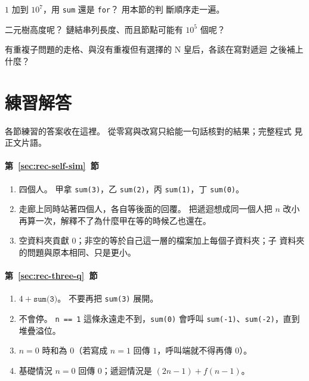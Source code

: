 
\begin{drills}[label=drills:rec-when]
\item $1$ 加到 $10^7$，用 \texttt{sum} 還是 \texttt{for}？ 用本節的判
斷順序走一遍。
\item 二元樹高度呢？ 鏈結串列長度、而且節點可能有 $10^5$ 個呢？
\item 有重複子問題的走格、與沒有重複但有選擇的 N 皇后，各該在寫對遞迴
之後補上什麼？
\end{drills}

{}
\section*{練習解答}

各節練習的答案收在這裡。 從零寫與改寫只給能一句話核對的結果；完整程式
見正文片語。

\paragraph{第~\ref{sec:rec-self-sim}~節}
\begin{enumerate}
\item 四個人。 甲拿 \texttt{sum(3)}，乙 \texttt{sum(2)}，丙
\texttt{sum(1)}，丁 \texttt{sum(0)}。
\item 走廊上同時站著四個人，各自等後面的回覆。 把遞迴想成同一個人把
$n$ 改小再算一次，解釋不了為什麼甲在等的時候乙也還在。
\item 空資料夾貢獻 $0$；非空的等於自己這一層的檔案加上每個子資料夾；子
資料夾的問題與原本相同、只是更小。
\end{enumerate}

\paragraph{第~\ref{sec:rec-three-q}~節}
\begin{enumerate}
\item $4 + \texttt{sum(3)}$。 不要再把 \texttt{sum(3)} 展開。
\item 不會停。 \texttt{n == 1} 這條永遠走不到，\texttt{sum(0)} 會呼叫
\texttt{sum(-1)}、\texttt{sum(-2)}，直到堆疊溢位。
\item $n = 0$ 時和為 $0$（若寫成 $n = 1$ 回傳 $1$，呼叫端就不得再傳
$0$）。
\item 基礎情況 $n = 0$ 回傳 $0$；遞迴情況是 $(2n-1) + f(n-1)$。
\end{enumerate}

